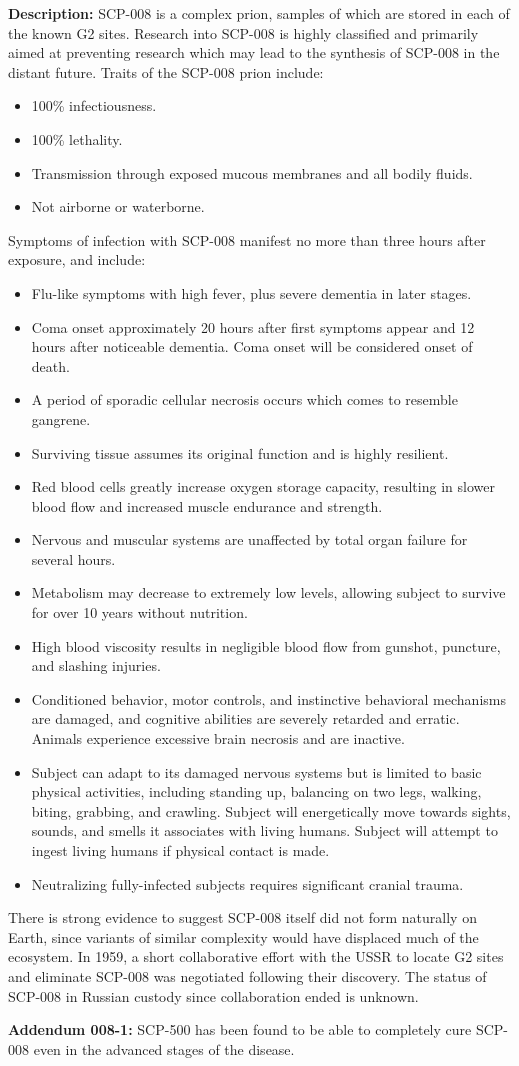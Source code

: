 \textbf{Description:} SCP-008 is a complex prion, samples of which are stored in each of the known G2 sites. Research into SCP-008 is highly classified and primarily aimed at preventing research which may lead to the synthesis of SCP-008 in the distant future. Traits of the SCP-008 prion include:
\newpage
\begin{itemize}
\renewcommand{\labelitemi}{$\ast$}
\item 100\% infectiousness.
\item 100\% lethality.
\item Transmission through exposed mucous membranes and all bodily fluids.
\item Not airborne or waterborne.
\end{itemize}
Symptoms of infection with SCP-008 manifest no more than three hours after exposure, and include:
\begin{itemize}
\renewcommand{\labelitemi}{$\ast$}
\item Flu-like symptoms with high fever, plus severe dementia in later stages.
\item Coma onset approximately 20 hours after first symptoms appear and 12 hours after noticeable dementia. Coma onset will be considered onset of death.
\item A period of sporadic cellular necrosis occurs which comes to resemble gangrene. \item Surviving tissue assumes its original function and is highly resilient.
\item Red blood cells greatly increase oxygen storage capacity, resulting in slower blood flow and increased muscle endurance and strength.
\item Nervous and muscular systems are unaffected by total organ failure for several hours.
\item Metabolism may decrease to extremely low levels, allowing subject to survive for over 10 years without nutrition.
\item High blood viscosity results in negligible blood flow from gunshot, puncture, and slashing injuries.
\item Conditioned behavior, motor controls, and instinctive behavioral mechanisms are damaged, and cognitive abilities are severely retarded and erratic. Animals experience excessive brain necrosis and are inactive.
\item Subject can adapt to its damaged nervous systems but is limited to basic physical activities, including standing up, balancing on two legs, walking, biting, grabbing, and crawling. Subject will energetically move towards sights, sounds, and smells it associates with living humans. Subject will attempt to ingest living humans if physical contact is made.
\item Neutralizing fully-infected subjects requires significant cranial trauma.
\end{itemize}
There is strong evidence to suggest SCP-008 itself did not form naturally on Earth, since variants of similar complexity would have displaced much of the ecosystem. In 1959, a short collaborative effort with the USSR to locate G2 sites and eliminate SCP-008 was negotiated following their discovery. The status of SCP-008 in Russian custody since collaboration ended is unknown.

\textbf{Addendum 008-1:} SCP-500 has been found to be able to completely cure SCP-008 even in the advanced stages of the disease.